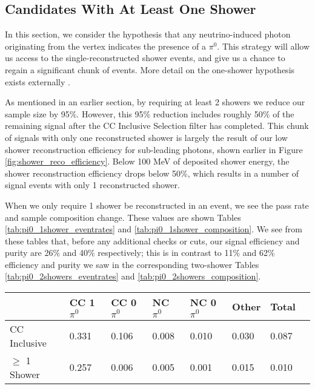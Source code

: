 \clearpage
\subsection{Candidates With At Least One Shower}
In this section, we consider the hypothesis that any neutrino-induced photon originating from the vertex indicates the presence of a $\pi^0$.  This strategy will allow us access to the single-reconstructed shower events, and give us a chance to regain a significant chunk of events. More detail on the one-shower hypothesis exists externally \cite{bib:timb_singleshower}.
\par As mentioned in an earlier section, by requiring at least 2 showers we reduce our sample size by 95\%.  However, this 95\% reduction includes roughly 50\% of the remaining signal after the CC Inclusive Selection filter has completed. This chunk of signals with only one reconstructed shower is largely the result of our low shower reconstruction efficiency for sub-leading photons, shown earlier in Figure \ref{fig:shower_reco_efficiency}. Below 100 MeV of deposited shower energy, the shower reconstruction efficiency drops below 50\%, which results in a number of signal events with only 1 reconstructed shower. 
\par When we only require 1 shower be reconstructed in an event, we see the pass rate and sample composition change.  These values are shown Tables \ref{tab:pi0_1shower_eventrates} and \ref{tab:pi0_1shower_composition}. We see from these tables that, before any additional checks or cuts, our signal efficiency and purity are 26\% and 40\% respectively; this is in contrast to 11\% and 62\% efficiency and purity we saw in the corresponding two-shower Tables \ref{tab:pi0_2showers_eventrates} and \ref{tab:pi0_2showers_composition}. 

\begin{table}[H]
\centering
{}
 \begin{tabular}{| l | l | l |l|l|l|l|l|}
 \hline
 & CC 1$\pi^0$ & CC 0$\pi^0$ & NC $\pi^0$ & NC 0$\pi^0$ & Other & Total \\ [0.1ex] \hline
CC Inclusive & 0.331 & 0.106 & 0.008 & 0.010 & 0.030 & 0.087 \\
$\geq$ 1 Shower & 0.257 & 0.006 & 0.005 & 0.001 & 0.015 & 0.010 \\ \hline
\end{tabular}
\end{table}


